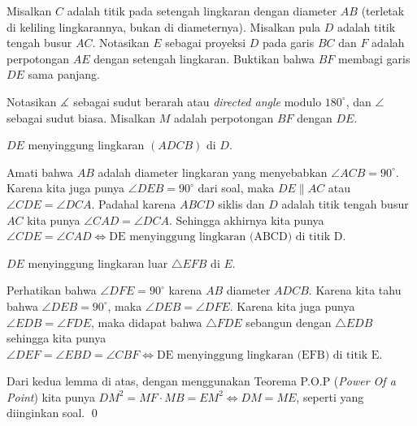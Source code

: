 \documentclass[12pt]{scrartcl}
\begin{document}
	\begin{soalbaru} 
		 Misalkan $C$ adalah titik pada setengah lingkaran dengan diameter $AB$ (terletak di keliling lingkarannya, bukan di diameternya). Misalkan pula $D$ adalah titik tengah busur $AC$. Notasikan $E$ sebagai proyeksi $D$ pada garis $BC$ dan $F$ adalah perpotongan $AE$ dengan setengah lingkaran. Buktikan bahwa $BF$ membagi garis $DE$ sama panjang.\\[-10pt]
		 
		 \begin{solusi}
		 Notasikan $\measuredangle$ sebagai sudut berarah atau \textit{ directed angle} modulo $180^\circ$, dan $\angle$ sebagai sudut biasa.
		 Misalkan $M$ adalah perpotongan $BF$ dengan $DE$.
		 \begin{lemmarev}
		 $DE$ menyinggung lingkaran $(ADCB)$ di $D$.
		 		 		 		 		 		 		 
             \begin{buktilemma}
                Amati bahwa $AB$ adalah diameter lingkaran yang menyebabkan $\angle ACB = 90^\circ$. Karena kita juga punya $\angle DEB=90^\circ$ dari soal, maka $DE \parallel AC$ atau $\angle CDE = \angle DCA$. Padahal karena $ABCD$ siklis dan $D$ adalah titik tengah busur $AC$ kita punya $\angle CAD = \angle DCA$. Sehingga akhirnya kita punya $\angle CDE = \angle CAD \iff \text{DE menyinggung lingkaran (ABCD) di titik D.}$
             \end{buktilemma}
		 		 		 		  
		 \end{lemmarev}

		 
		 \begin{lemmarev}
		 $DE$ menyinggung lingkaran luar $\triangle EFB$ di $E$.
		 		 		
            \begin{buktilemma}
                Perhatikan bahwa $\angle DFE = 90^\circ$ karena $AB$ diameter $ADCB$. Karena kita tahu bahwa $\angle DEB = 90^\circ$, maka $\angle DEB = \angle DFE$. Karena kita juga punya $\angle EDB = \angle FDE$, maka didapat bahwa $\triangle FDE$ sebangun dengan $\triangle EDB$ sehingga kita punya $\angle DEF= \angle EBD = \angle CBF \iff \text{DE menyinggung lingkaran (EFB) di titik E.}$
            \end{buktilemma}
		 		 		
		 \end{lemmarev}
		 	
		 Dari kedua lemma di atas, dengan menggunakan Teorema P.O.P (\textit{Power Of a Point}) kita punya $DM^2 = MF\cdot MB = EM^2 \iff DM = ME$, seperti yang diinginkan soal. \qed		 
		 		 		 
		 \end{solusi}
	\end{soalbaru}
	
\end{document}
